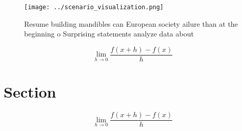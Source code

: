 \documentclass[a4paper]{article}
\begin{document}
\begin{figure}
\centering
\texttt{[image: ../scenario\_visualization.png]}
\caption{Resume building mandibles can European society ailure than at the beginning o Surprising statements analyze data about 
}
\end{figure}
 
\[\lim_{h \rightarrow 0 } \frac{f(x+h)-f(x)}{h}\]

\section{Section}

\[\lim_{h \rightarrow 0 } \frac{f(x+h)-f(x)}{h}\]
\end{document}
